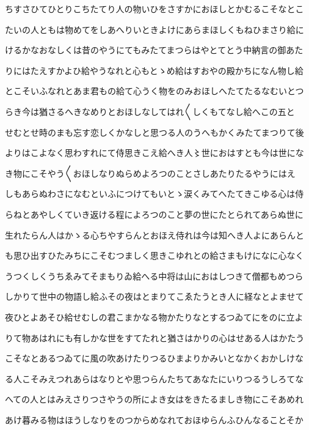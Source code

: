 \documentclass[a4paper,11pt,landscape]{ltjtarticle}
\begin{document}
\par\medskip
ちすさひてひとりこちたてり人の物いひをさすかにおほしとかむるこそなとこ
\par\medskip
たいの人ともは物めてをしあへりいときよけにあらまほしくもねひまさり給に
\par\medskip
けるかなおなしくは昔のやうにてもみたてまつらはやとてとう中納言の御あた
\par\medskip
りにはたえすかよひ給やうなれと心もとゝめ給はすおやの殿かちになん物し給
\par\medskip
とこそいふなれとあま君もの給て心うく物をのみおほしへたてたるなむいとつ
\par\medskip
らき今は猶さるへきなめりとおほしなしてはれ〱しくもてなし給へこの五と
\par\medskip
せむとせ時のまも忘す恋しくかなしと思つる人のうへもかくみたてまつりて後
\par\medskip
よりはこよなく思わすれにて侍思きこえ給へき人〻世におはすとも今は世にな
\par\medskip
き物にこそやう〱おほしなりぬらめよろつのことさしあたりたるやうにはえ
\par\medskip
しもあらぬわさになむといふにつけてもいとゝ涙くみてへたてきこゆる心は侍
\par\medskip
らねとあやしくていき返ける程によろつのこと夢の世にたとられてあらぬ世に
\par\medskip
生れたらん人はかゝる心ちやすらんとおほえ侍れは今は知へき人よにあらんと
\par\medskip
も思ひ出すひたみちにこそむつましく思きこゆれとの給さまもけになに心なく
\par\medskip
うつくしくうちゑみてそまもりゐ給へる中将は山におはしつきて僧都もめつら
\par\medskip
しかりて世中の物語し給ふその夜はとまりてこゑたうとき人に経なとよませて
\par\medskip
夜ひとよあそひ給せむしの君こまかなる物かたりなとするつゐてにをのに立よ
\par\medskip
りて物あはれにも有しかな世をすてたれと猶さはかりの心はせある人はかたう
\par\medskip
こそなとあるつゐてに風の吹あけたりつるひまよりかみいとなかくおかしけな
\par\medskip
る人こそみえつれあらはなりとや思つらんたちてあなたにいりつるうしろてな
\par\medskip
へての人とはみえさりつさやうの所によき女はをきたるましき物にこそあめれ
\par\medskip
あけ暮みる物はほうしなりをのつからめなれておほゆらんふひんなることそか
\end{document}
